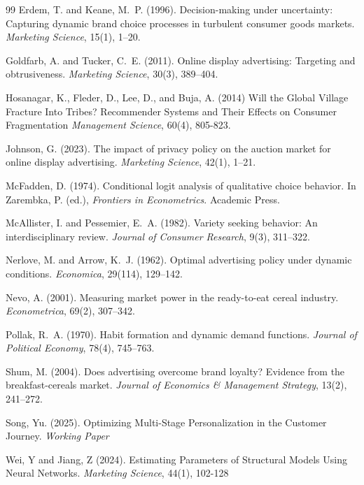 \documentclass[12pt]{article}
\begin{document}
\begin{thebibliography}{99}
 Erdem, T. and Keane, M.~P. (1996).
 \newblock Decision-making under uncertainty: Capturing dynamic brand choice
           processes in turbulent consumer goods markets.
 \newblock \emph{Marketing Science}, 15(1), 1--20.

 Goldfarb, A. and Tucker, C.~E. (2011).
 \newblock Online display advertising: Targeting and obtrusiveness.
 \newblock \emph{Marketing Science}, 30(3), 389--404.

 Hosanagar, K., Fleder, D., Lee, D., and Buja, A. (2014)
 \newblock Will the Global Village Fracture Into Tribes? Recommender Systems and Their Effects on Consumer Fragmentation
 \newblock \textit{Management Science}, 60(4), 805-823.

 Johnson, G. (2023).
 \newblock The impact of privacy policy on the auction market for online display advertising.
 \newblock \emph{Marketing Science}, 42(1), 1--21.

 McFadden, D. (1974).
 \newblock Conditional logit analysis of qualitative choice behavior.
 \newblock In Zarembka, P. (ed.), \emph{Frontiers in Econometrics}. Academic Press.

 McAllister, I. and Pessemier, E.~A. (1982).
 \newblock Variety seeking behavior: An interdisciplinary review.
 \newblock \emph{Journal of Consumer Research}, 9(3), 311--322.

 Nerlove, M. and Arrow, K.~J. (1962).
 \newblock Optimal advertising policy under dynamic conditions.
 \newblock \emph{Economica}, 29(114), 129--142.

 Nevo, A. (2001).
 \newblock Measuring market power in the ready-to-eat cereal industry.
 \newblock \emph{Econometrica}, 69(2), 307--342.

 Pollak, R.~A. (1970).
 \newblock Habit formation and dynamic demand functions.
 \newblock \emph{Journal of Political Economy}, 78(4), 745--763.

 Shum, M. (2004).
 \newblock Does advertising overcome brand loyalty? Evidence from the breakfast-cereals market.
 \newblock \emph{Journal of Economics \& Management Strategy}, 13(2), 241--272.

 Song, Yu. (2025).
 \newblock Optimizing Multi-Stage Personalization in the Customer Journey.
 \newblock \textit{Working Paper}

 Wei, Y and Jiang, Z (2024).
 \newblock Estimating Parameters of Structural Models Using Neural Networks.
 \newblock \textit{Marketing Science}, 44(1), 102-128


 \end{thebibliography}
\end{document}
